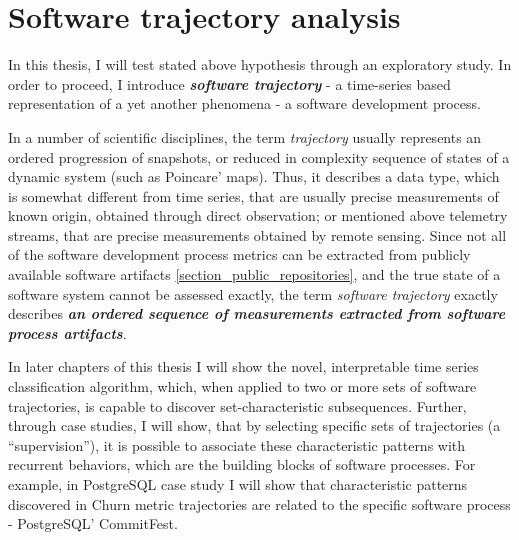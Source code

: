 \section{Software trajectory analysis}\label{section_trajectory_definition}
In this thesis, I will test stated above hypothesis through an exploratory study. In order to proceed, 
I introduce \textit{\textbf{software trajectory}} - a time-series based representation of a yet another 
phenomena - a software development process. 

In a number of scientific disciplines, the term \textit{trajectory} usually represents 
an ordered progression of snapshots, or reduced in complexity sequence of states of a dynamic 
system (such as Poincare' maps). 
Thus, it describes a data type, which is somewhat different from time series, that are usually precise
measurements of known origin, obtained through direct observation; 
or mentioned above telemetry streams, that are precise measurements obtained by remote 
sensing. Since not all of the software development process metrics can be extracted from publicly 
available software artifacts \ref{section_public_repositories}, and the true state of a software system 
cannot be assessed exactly, the term \textit{software trajectory} exactly describes
\textbf{\textit{an ordered 
sequence of measurements extracted from software process artifacts}}.

In later chapters of this thesis I will show the novel, interpretable time series classification algorithm, which,
when applied to two or more sets of software trajectories, is capable to discover set-characteristic subsequences.
Further, through case studies, I will show, that by selecting specific sets of trajectories (a ``supervision''),
it is possible to associate these characteristic patterns with recurrent behaviors, which are the building blocks of 
software processes. For example, in PostgreSQL case study I will show that characteristic patterns discovered 
in Churn metric trajectories are related to the specific software process - PostgreSQL' CommitFest.



